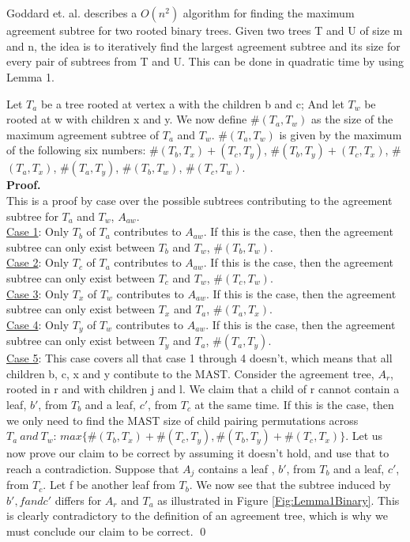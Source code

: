 \chapter{}
Goddard et. al.\cite{nsquared} describes a $O(n^2)$ algorithm for finding the maximum agreement subtree for two rooted binary trees. Given two trees T and U of size m and n, the idea is to iteratively find the largest agreement subtree and its size for every pair of subtrees from T and U. This can be done in quadratic time by using Lemma 1. 

\begin{Lemma}
	Let $T_a$ be a tree rooted at vertex a with the children b and c; And let $T_w$ be rooted at w with children x and y. We now define $\#(T_a,T_w)$ as the size of the maximum agreement subtree of $T_a$ and $T_w$.  $\#(T_a,T_w)$ is given by the maximum of the following six numbers: \#$(T_b,T_x)+(T_c,T_y)$,
	\#$(T_b,T_y)+(T_c,T_x)$,
	\#$(T_a,T_x)$,
	\#$(T_a,T_y)$,
	\#$(T_b,T_w)$,
	\#$(T_c,T_w)$.\\
	\textbf{Proof.}\\
	This is a proof by case over the possible subtrees contributing to the agreement subtree for $T_a$ and $T_w$, $A_{aw}$.\\
	\underline{Case 1}: Only $T_b$ of $T_a$ contributes to $A_{aw}$.
	If this is the case, then the agreement subtree can only exist between $T_b$ and $T_w$, \#$(T_b,T_w)$.\\
	\underline{Case 2}: Only $T_c$ of $T_a$ contributes to $A_{aw}$.
	If this is the case, then the agreement subtree can only exist between $T_c$ and $T_w$,
	\#$(T_c,T_w)$.\\
	\underline{Case 3}: Only $T_x$ of $T_w$ contributes to $A_{aw}$.
	If this is the case, then the agreement subtree can only exist between $T_x$ and $T_a$,
	\#$(T_a,T_x)$.\\
	\underline{Case 4}: Only $T_y$ of $T_w$ contributes to $A_{aw}$.
	If this is the case, then the agreement subtree can only exist between $T_y$ and $T_a$,
	\#$(T_a,T_y)$.\\
	\underline{Case 5}: This case covers all that case 1 through 4 doesn't, which means that all children b, c, x and y contibute to the MAST.
	Consider the agreement tree, $A_r$, rooted in r and with children j and l. We claim that a child of r cannot contain a leaf, $b'$, from $T_b$ and a leaf, $c'$, from $T_c$ at the same time. If this is the case, then we only need to find the MAST size of child pairing permutations across $T_a\ and\ T_w$: $max\{\#(T_b, T_x)+\#(T_c, T_y), \#(T_b, T_y)+\#(T_c, T_x)\}$.
	Let us now prove our claim to be correct by assuming it doesn't hold, and use that to reach a  contradiction. Suppose that $A_j$ contains a leaf , $b'$, from $T_b$ and a leaf, $c'$, from $T_c$. Let f be another leaf from $T_b$. We now see that the subtree induced by $b', f and c'$ differs for $A_r$ and $T_a$ as illustrated in Figure \ref{Fig:Lemma1Binary}. This is clearly contradictory to the definition of an agreement tree, which is why we must conclude our claim to be correct.
	\qed   	  
\end{Lemma}

